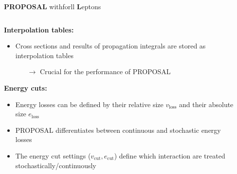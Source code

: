 \begin{frame}{}
  \vspace{-3cm}
  \begin{minipage}[t][1cm][t]{\textwidth}
  {\huge \textbf{PROPOSAL}} {\huge\textbf{\rightarrow}}
  \colorbox{tugreen}{}{\Large with}\colorbox{tugreen}{}{\Large for}\colorbox{tugreen}{ll {\huge \textbf{L}}{\Large eptons}}
  \end{minipage}
  \begin{minipage}[t][1cm][t]{\textwidth}
    \begin{columns}[onlytextwidth]
        \begin{column}{0.5\textwidth}
          \textbf{Interpolation tables:}
            \begin{itemize}
              \item Cross sections and results of propagation integrals are stored as interpolation tables
              \begin{itemize}
                \item[$\rightarrow$] Crucial for the performance of PROPOSAL
              \end{itemize}
            \end{itemize}
          \textbf{Energy cuts:}
          \begin{itemize}
            \item Energy losses can be defined by their relative size $v_\text{loss}$ and their absolute size $e_\text{loss}$
            \item PROPOSAL differentiates between continuous and stochastic energy losses
            \item The energy cut settings ($v_\text{cut}, e_\text{cut}$) define which interaction are treated stochastically/continuously
          \end{itemize}
        \end{column}
        \begin{column}{0.5\textwidth}


\end{column}
\end{columns}
\end{minipage}
\end{frame}
